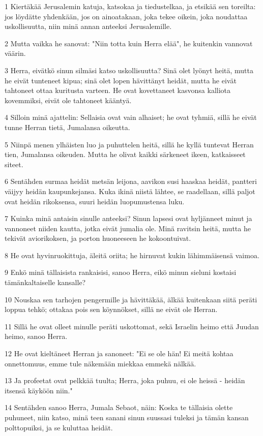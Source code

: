 \par 1 Kiertäkää Jerusalemin katuja, katsokaa ja tiedustelkaa, ja etsikää sen toreilta: jos löydätte yhdenkään, jos on ainoatakaan, joka tekee oikein, joka noudattaa uskollisuutta, niin minä annan anteeksi Jerusalemille.
\par 2 Mutta vaikka he sanovat: "Niin totta kuin Herra elää", he kuitenkin vannovat väärin.
\par 3 Herra, eivätkö sinun silmäsi katso uskollisuutta? Sinä olet lyönyt heitä, mutta he eivät tunteneet kipua; sinä olet lopen hävittänyt heidät, mutta he eivät tahtoneet ottaa kuritusta varteen. He ovat kovettaneet kasvonsa kalliota kovemmiksi, eivät ole tahtoneet kääntyä.
\par 4 Silloin minä ajattelin: Sellaisia ovat vain alhaiset; he ovat tyhmiä, sillä he eivät tunne Herran tietä, Jumalansa oikeutta.
\par 5 Niinpä menen ylhäisten luo ja puhuttelen heitä, sillä he kyllä tuntevat Herran tien, Jumalansa oikeuden. Mutta he olivat kaikki särkeneet ikeen, katkaisseet siteet.
\par 6 Sentähden surmaa heidät metsän leijona, aavikon susi haaskaa heidät, pantteri väijyy heidän kaupunkejansa. Kuka ikinä niistä lähtee, se raadellaan, sillä paljot ovat heidän rikoksensa, suuri heidän luopumustensa luku.
\par 7 Kuinka minä antaisin sinulle anteeksi? Sinun lapsesi ovat hyljänneet minut ja vannoneet niiden kautta, jotka eivät jumalia ole. Minä ravitsin heitä, mutta he tekivät aviorikoksen, ja porton huoneeseen he kokoontuivat.
\par 8 He ovat hyvinruokittuja, äleitä oriita; he hirnuvat kukin lähimmäisensä vaimoa.
\par 9 Enkö minä tällaisista rankaisisi, sanoo Herra, eikö minun sieluni kostaisi tämänkaltaiselle kansalle?
\par 10 Nouskaa sen tarhojen pengermille ja hävittäkää, älkää kuitenkaan siitä peräti loppua tehkö; ottakaa pois sen köynnökset, sillä ne eivät ole Herran.
\par 11 Sillä he ovat olleet minulle peräti uskottomat, sekä Israelin heimo että Juudan heimo, sanoo Herra.
\par 12 He ovat kieltäneet Herran ja sanoneet: "Ei se ole hän! Ei meitä kohtaa onnettomuus, emme tule näkemään miekkaa emmekä nälkää.
\par 13 Ja profeetat ovat pelkkää tuulta; Herra, joka puhuu, ei ole heissä - heidän itsensä käyköön niin."
\par 14 Sentähden sanoo Herra, Jumala Sebaot, näin: Koska te tällaisia olette puhuneet, niin katso, minä teen sanani sinun suussasi tuleksi ja tämän kansan polttopuiksi, ja se kuluttaa heidät.
